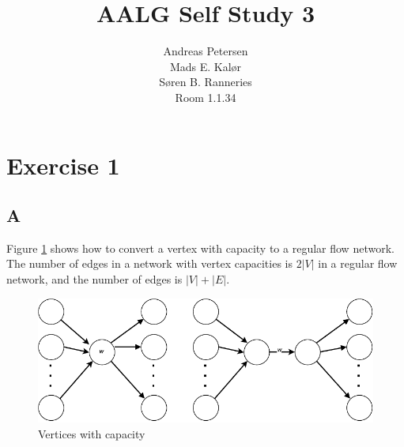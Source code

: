 \documentclass[koma,a4paper]{article}
\title{AALG Self Study 3}
\author{Andreas Petersen\\
Mads E. Kalør\\
Søren B. Ranneries\\
Room 1.1.34}
\begin{document}
\maketitle

\pagebreak

\section{Exercise 1}

\subsection{A}
Figure \ref{fig:vertices_capacity} shows how to convert a vertex with capacity to a regular flow network. The number of edges in a network with vertex capacities is $2|V|$ in a regular flow network, and the number of edges is $|V|+|E|$.

\begin{figure}
  \includegraphics{weighted_vertices}
  \caption{Vertices with capacity}
  \label{fig:vertices_capacity}
\end{figure}
\end{document}
